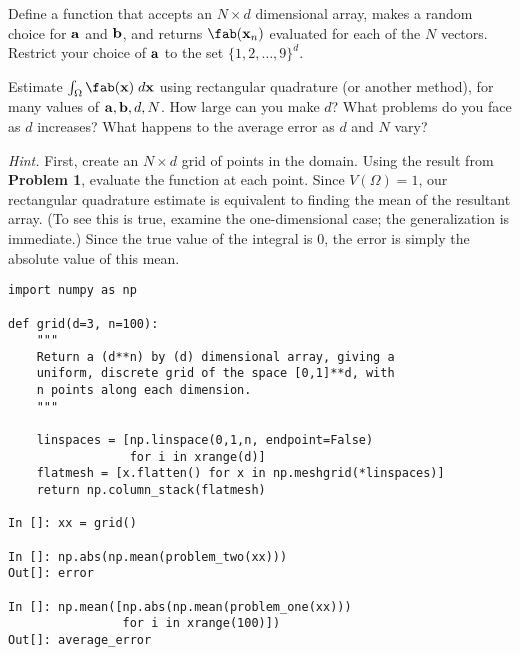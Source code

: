 \begin{problem}
\label{prob:fab}
Define a function that accepts an $N \times d$ dimensional array, makes a random
choice for ${\bf a}$ and ${\bf b}$, and returns $\fab({\bf x}_n)$ evaluated for
each of the $N$ vectors. Restrict your choice of ${\bf a}$ to the set
$\{1,2,\ldots,9\}^d$.
\end{problem}

\begin{problem}
\label{prob:grid}
Estimate $\int_{\Omega} \fab({\bf x}) \;d{\bf x}$ using rectangular quadrature
(or another method), for many values of ${\bf a}, {\bf b}, d, N$. How large can
you make $d$?  What problems do you face as $d$ increases? What happens to the
average error as $d$ and $N$ vary?

\nopagebreak[2]

\vspace{5mm}
\noindent
{\it Hint.} First, create an $N \times d$ grid of points in the domain. Using
the result from {\bf Problem 1}, evaluate the function at each point. Since
$V(\Omega) = 1$, our rectangular quadrature estimate is equivalent to finding
the mean of the resultant array. (To see this is true, examine the
one-dimensional case; the generalization is immediate.) Since the true value of
the integral is $0$, the error is simply the absolute value of this mean.

\nopagebreak[2]

\begin{verbatim}
import numpy as np

def grid(d=3, n=100):
    """
    Return a (d**n) by (d) dimensional array, giving a 
    uniform, discrete grid of the space [0,1]**d, with 
    n points along each dimension.
    """

    linspaces = [np.linspace(0,1,n, endpoint=False) 
                 for i in xrange(d)]
    flatmesh = [x.flatten() for x in np.meshgrid(*linspaces)]
    return np.column_stack(flatmesh)

In []: xx = grid()

In []: np.abs(np.mean(problem_two(xx)))
Out[]: error

In []: np.mean([np.abs(np.mean(problem_one(xx)))
                for i in xrange(100)])
Out[]: average_error
\end{verbatim}
\end{problem}

